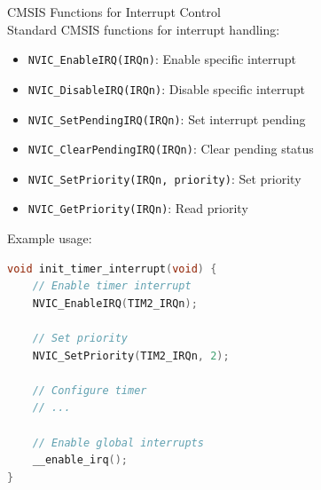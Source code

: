 \begin{KR}{CMSIS Functions for Interrupt Control}\\
Standard CMSIS functions for interrupt handling:
\begin{itemize}
  \item \texttt{NVIC\_EnableIRQ(IRQn)}: Enable specific interrupt
  \item \texttt{NVIC\_DisableIRQ(IRQn)}: Disable specific interrupt
  \item \texttt{NVIC\_SetPendingIRQ(IRQn)}: Set interrupt pending
  \item \texttt{NVIC\_ClearPendingIRQ(IRQn)}: Clear pending status
  \item \texttt{NVIC\_SetPriority(IRQn, priority)}: Set priority
  \item \texttt{NVIC\_GetPriority(IRQn)}: Read priority
\end{itemize}

Example usage:
\begin{lstlisting}[language=C, style=basesmol]
void init_timer_interrupt(void) {
    // Enable timer interrupt
    NVIC_EnableIRQ(TIM2_IRQn);
    
    // Set priority
    NVIC_SetPriority(TIM2_IRQn, 2);
    
    // Configure timer
    // ...
    
    // Enable global interrupts
    __enable_irq();
}
\end{lstlisting}
\end{KR}


